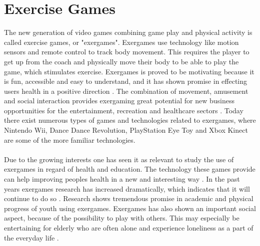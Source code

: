 \section{Exercise Games}
The new generation of video games combining game play and physical activity is called exercise games, or "exergames". Exergames use technology like motion sensors and remote control to track body movement. This requires the player to get up from the coach and physically move their body to be able to play the game, which stimulates exercise. Exergames is proved to be motivating because it is fun, accessible and easy to understand, and it has shown promise in effecting users health in a positive direction \cite{promotingexercise}. The combination of movement, amusement and social interaction provides exergaming great potential for new business opportunities for the entertainment, recreation and healthcare sectors \cite{gamingforhealth}. Today there exist numerous types of games and technologies related to exergames, where Nintendo Wii, Dance Dance Revolution, PlayStation Eye Toy and Xbox Kinect are some of the more familiar technologies. \\ \\
Due to the growing interests one has seen it as relevant to study the use of exergames in regard of health and education. The technology these games provide can help improving peoples health in a new and interesting way \cite{gamingforhealth}. In the past years exergames research has increased dramatically, which indicates that it will continue to do so \cite{chamberlin2008exergames}. Research shows tremendous promise in academic and physical progress of youth using exergames. Exergames has also shown an important social aspect, because of the possibility to play with others. This may especially be entertaining for elderly who are often alone and experience loneliness as a part of the everyday life \cite{exergamesforelderly}. \\ \\
